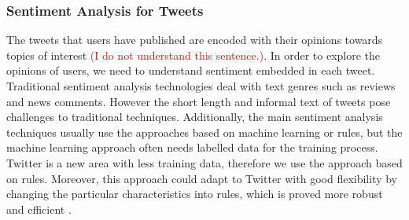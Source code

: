 \documentclass{acm_proc_article-sp}
\newcommand{\mo}[1]{\textcolor{red}{#1}}
\begin{document}
\subsubsection{Sentiment Analysis for Tweets}
\label{sentiment}
The tweets that users have published are encoded with their opinions towards topics of interest \mo{(I do not understand this sentence.)}. 
In order to explore the opinions of users, we need to understand sentiment embedded in each tweet.
Traditional sentiment analysis technologies deal with text genres such as reviews and news comments. 
However the short length and informal text of tweets pose challenges to traditional techniques.
Additionally, the main sentiment analysis techniques usually use the approaches based on machine learning or rules, but the machine learning approach often needs labelled data for the training process. Twitter is a new area with less training data, therefore we use the approach based on rules. Moreover, this approach
could adapt to Twitter with good flexibility by changing the particular characteristics into rules, which is proved more robust and efficient \cite{Thelwall:2010SSS,Hu:2013www}.
\end{document}
